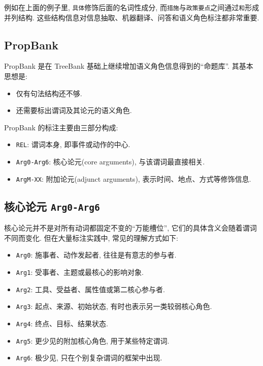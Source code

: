 例如在上面的例子里, \texttt{具体}修饰后面的名词性成分,
而\texttt{措施}与\texttt{政策要点}之间通过\texttt{和}形成并列结构.
这些结构信息对信息抽取、机器翻译、问答和语义角色标注都非常重要.

\subsection{PropBank}


PropBank 是在 TreeBank 基础上继续增加语义角色信息得到的“命题库”.
其基本思想是:

\begin{itemize}
\item 仅有句法结构还不够.
\item 还需要标出谓词及其论元的语义角色.
\end{itemize}

PropBank 的标注主要由三部分构成:

\begin{itemize}
\item \texttt{REL}: 谓词本身, 即事件或动作的中心.
\item \texttt{Arg0-Arg6}: 核心论元(core arguments), 与该谓词最直接相关.
\item \texttt{ArgM-XX}: 附加论元(adjunct arguments), 表示时间、地点、方式等修饰信息.
\end{itemize}

\subsection{核心论元 \texttt{Arg0-Arg6}}


核心论元并不是对所有动词都固定不变的“万能槽位”,
它们的具体含义会随着谓词不同而变化.
但在大量标注实践中, 常见的理解方式如下:

\begin{itemize}
\item \texttt{Arg0}: 施事者、动作发起者, 往往是有意志的参与者.
\item \texttt{Arg1}: 受事者、主题或最核心的影响对象.
\item \texttt{Arg2}: 工具、受益者、属性值或第二核心参与者.
\item \texttt{Arg3}: 起点、来源、初始状态, 有时也表示另一类较弱核心角色.
\item \texttt{Arg4}: 终点、目标、结果状态.
\item \texttt{Arg5}: 更少见的附加核心角色, 用于某些特定谓词.
\item \texttt{Arg6}: 极少见, 只在个别复杂谓词的框架中出现.
\end{itemize}

